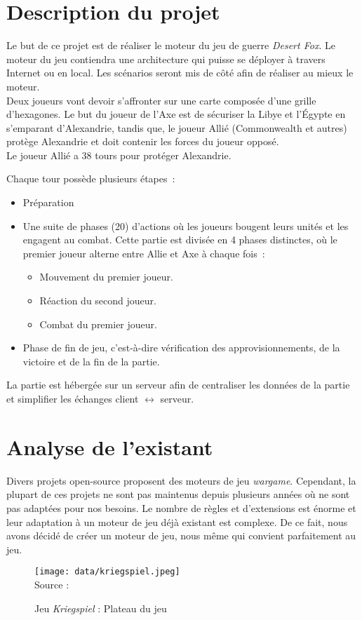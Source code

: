 \section{Description du projet}

Le but de ce projet est de réaliser le moteur du jeu de guerre \emph{Desert Fox}.
Le moteur du jeu contiendra une architecture qui puisse se déployer à travers Internet ou en local.
Les scénarios seront mis de côté afin de réaliser au mieux le moteur.\\

Deux joueurs vont devoir s'affronter sur une carte composée d'une grille d'hexagones.
Le but du joueur de l'Axe est de sécuriser la Libye et l'Égypte en s'emparant d'Alexandrie, tandis que, le joueur Allié (Commonwealth et autres) protège Alexandrie et doit contenir les forces du joueur opposé.\\
Le joueur Allié a 38 tours pour protéger Alexandrie.

Chaque tour possède plusieurs étapes :
\begin{itemize}
    \item Préparation
    \item Une suite de phases (20) d'actions où les joueurs bougent leurs unités et les engagent au combat.
          Cette partie est divisée en 4 phases distinctes, où le premier joueur alterne entre Allie et Axe à chaque fois :
          \begin{itemize}
              \item Mouvement du premier joueur.
              \item Réaction du second joueur.
              \item Combat du premier joueur.
          \end{itemize}
    \item Phase de fin de jeu, c'est-à-dire vérification des approvisionnements, de la victoire et de la fin de la partie.
\end{itemize}


La partie est hébergée sur un serveur afin de centraliser les données de la partie et simplifier les échanges client $\leftrightarrow$ serveur.

\section{Analyse de l'existant}

Divers projets open-source proposent des moteurs de jeu \emph{wargame}. Cependant, la plupart de ces projets ne sont pas maintenus depuis plusieurs années où ne sont pas adaptées pour nos besoins.
Le nombre de règles et d'extensions est énorme et leur adaptation à un moteur de jeu déjà existant est complexe.
De ce fait, nous avons décidé de créer un moteur de jeu, nous même qui convient parfaitement au jeu.
\begin{figure}[H]
    \centering
    \texttt{[image: data/kriegspiel.jpeg]}\\
    Source : 
    \caption{Jeu \textit{Kriegspiel} : Plateau du jeu}
\end{figure}


